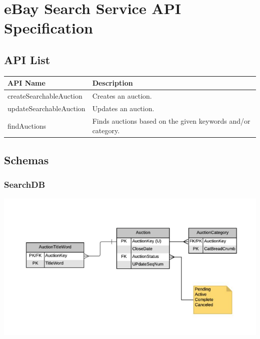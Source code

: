 \documentclass[12pt,a4paper]{article}
\begin{document}
 
\section{eBay Search Service API Specification}

\subsection{API List}
\begin{center}
    \begin{tabular}{| l | l |}
        \hline
        \textbf{API Name} & \textbf{Description} \\
        \hline
            createSearchableAuction & Creates an auction. \\ 
        \hline
            updateSearchableAuction & Updates an auction. \\
        \hline
            findAuctions & Finds auctions based on the given keywords and/or category. \\
        \hline
    \end{tabular}
\end{center}

\subsection{Schemas}

\subsubsection{SearchDB}
\includegraphics[scale=0.5]{images/Screen Shot 2021-01-22 at 11.34.49 PM.png}
\end{document}
